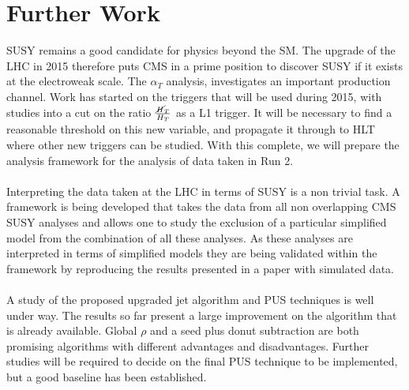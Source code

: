 \section{Further Work}
\label{sec:conclusion}

SUSY remains a good candidate for physics beyond the SM. The upgrade of the LHC in 2015 therefore puts CMS in a prime position to discover SUSY if it exists at the electroweak scale. The $\alpha_T$ analysis, investigates an important production channel. Work has started on the triggers that will be used during 2015, with studies into a cut on the ratio $\frac{\cancel{H}_T}{H_T}$ as a L1 trigger. It will be necessary to find a reasonable threshold on this new variable, and propagate it through to HLT where other new triggers can be studied. With this complete, we will prepare the analysis framework for the analysis of data taken in Run 2.
\\\\
Interpreting the data taken at the LHC in terms of SUSY is a non trivial task. A framework is being developed that takes the data from all non overlapping CMS SUSY analyses and allows one to study the exclusion of a particular simplified model from the combination of all these analyses. As these analyses are interpreted in terms of simplified models they are being validated within the framework by reproducing the results presented in a paper with simulated data.
\\\\
A study of the proposed upgraded jet algorithm and PUS techniques is well under way. The results so far present a large improvement on the algorithm that is already available. Global $\rho$ and a seed plus donut subtraction are both promising algorithms with different advantages and disadvantages. Further studies will be required to decide on the final PUS technique to be implemented, but a good baseline has been established.